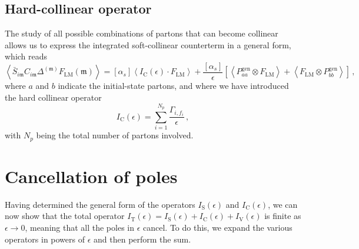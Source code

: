 \documentclass[a4paper, 12pt]{book}
\newcommand{\um}{\mathfrak{m}}
\begin{document}
\subsection{Hard-collinear operator}
The study of all possible combinations of partons that can become collinear allows us to express the integrated soft-collinear counterterm in a general form, which reads
\begin{equation}
  \left< \bar{S}_{i\um} C_{i\um} \Delta^{(\um)} F_{\mathrm{LM}}(\um)\right> = [\alpha_s] \left< I_{\mathrm{C}}(\epsilon) \cdot F_{\mathrm{LM}} \right> + \frac{[\alpha_s]}{\epsilon} \left[\left< P_{aa}^{\mathrm{gen}} \otimes F_{\mathrm{LM}} \right> + \left< F_{\mathrm{LM}} \otimes P_{bb}^{\mathrm{gen}}  \right>\right] \, , 
  \label{soft-collinear-integrated}
\end{equation}
where $a$ and $b$  indicate the initial-state partons, and where we have introduced the hard collinear operator
\begin{equation}
  I_{\mathrm{C}}(\epsilon) = \sum_{i=1}^{N_p} \frac{\Gamma_{i,f_i}}{\epsilon}  \, ,
  \label{IC-def}
\end{equation}
with $N_p$  being the total number of partons involved.

\section{Cancellation of poles}
\label{pole-cancellation-section}
Having determined the general form of the operators $I_{\mathrm{S}}(\epsilon)$ and $I_{\mathrm{C}}(\epsilon)$, we can now show that the total operator $I_{\mathrm{T}} (\epsilon)=I_{\mathrm{S}}(\epsilon)+I_{\mathrm{C}}(\epsilon)+I_{\mathrm{V}}(\epsilon)$ is finite as $\epsilon \to 0$, meaning that all the poles in $\epsilon$ cancel. To do this, we expand the various operators in powers of $\epsilon$ and then perform the sum. \\
\end{document}
